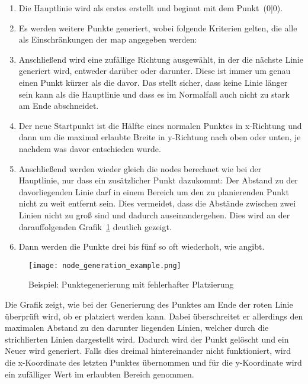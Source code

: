 \begin{enumerate}
    \item Die Hauptlinie wird als erstes erstellt und beginnt mit dem Punkt~(0|0).
    \item Es werden  weitere Punkte generiert, wobei folgende Kriterien gelten, die alle als Einschränkungen der map angegeben werden:
    \item Anschließend wird eine zufällige Richtung ausgewählt, in der die nächste Linie generiert wird, entweder darüber oder darunter.
    Diese ist immer um genau einen Punkt kürzer als die davor.
    Das stellt sicher, dass keine Linie länger sein kann als die Hauptlinie und dass es im Normalfall auch nicht zu stark am Ende abschneidet.
    \item Der neue Startpunkt ist die Hälfte eines normalen Punktes in x-Richtung und dann um die maximal erlaubte Breite in y-Richtung nach oben oder unten, je nachdem was davor entschieden wurde.
    \item Anschließend werden wieder gleich die nodes berechnet wie bei der Hauptlinie, nur dass ein zusätzlicher Punkt dazukommt:
    Der Abstand zu der davorliegenden Linie darf in einem Bereich um den zu planierenden Punkt nicht zu weit entfernt sein.
    Dies vermeidet, dass die Abstände zwischen zwei Linien nicht zu groß sind und dadurch auseinandergehen.
    Dies wird an der darauffolgenden Grafik~\ref{fig:point-generation} deutlich gezeigt.
    \item Dann werden die Punkte drei bis fünf so oft wiederholt, wie  angibt.
\end{enumerate}

\begin{figure}[H]
    \centering
    \texttt{[image: node\_generation\_example.png]}
    \caption{Beispiel: Punktegenerierung mit fehlerhafter Platzierung}\label{fig:point-generation}
\end{figure}
Die Grafik zeigt, wie bei der Generierung des Punktes am Ende der roten Linie überprüft wird, ob er platziert werden kann.
Dabei überschreitet er allerdings den maximalen Abstand zu den darunter liegenden Linien, welcher durch die strichlierten Linien dargestellt wird.
Dadurch wird der Punkt gelöscht und ein Neuer wird generiert.
Falls dies dreimal hintereinander nicht funktioniert, wird die x-Koordinate des letzten Punktes übernommen und für die y-Koordinate wird ein zufälliger Wert im erlaubten Bereich genommen.

